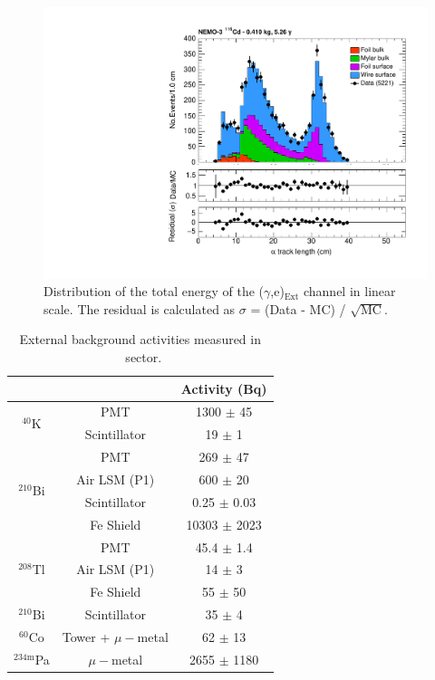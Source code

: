 \documentclass[main.tex]{subfiles}
\begin{document}
\begin{figure}[h!]
\centering
\includegraphics[page=3,scale=0.55]{pictures/Chap6/FinalPlots.pdf}
\caption{Distribution of the total energy of the ($\gamma$,e)$_{\text{Ext}}$ channel in linear scale. The residual is calculated as $\sigma$ = (Data - MC) / $\sqrt{\text{MC}}$.}
\label{egChannel_Etot}
\end{figure}




\begin{table}
\centering
\begin{tabular}{c|c|c}
                                   &              &  Activity (Bq)   \\
\toprule
\multirow{2}{*}{$^{\text{40}}$K}   & PMT          & 1300  $\pm$ 45   \\
                                   & Scintillator & 19    $\pm$ 1    \\
\hline
\multirow{4}{*}{$^{\text{210}}$Bi} & PMT          & 269   $\pm$ 47   \\
                                   & Air LSM (P1) & 600   $\pm$ 20   \\
                                   & Scintillator & 0.25  $\pm$ 0.03 \\
                                   & Fe Shield    & 10303 $\pm$ 2023 \\
\hline
\multirow{3}{*}{$^{\text{208}}$Tl} & PMT          & 45.4   $\pm$ 1.4 \\
                                   & Air LSM (P1) & 14     $\pm$ 3   \\
                                   & Fe Shield    & 55     $\pm$ 50  \\
\hline
$^{\text{210}}$Bi                  & Scintillator & 35     $\pm$ 4  \\
\hline
$^{\text{60}}$Co                   & Tower + $\mu-$metal & 62 $\pm$ 13  \\
\hline
$^{\text{234m}}$Pa                 & $\mu-$metal & 2655 $\pm$ 1180  \\
\bottomrule
\end{tabular}
\caption{External background activities measured in \Cd~sector.}
\label{TableOCE-activityMeasurement}
\end{table}
\end{document}
